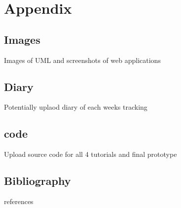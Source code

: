 \chapter{Appendix}
\section{Images}
Images of UML and screenshots of web applications
\section{Diary}
Potentially uplaod diary of each weeks tracking
\section{code}
Upload source code for all 4 tutorials and final prototype
\section{Bibliography}
references 